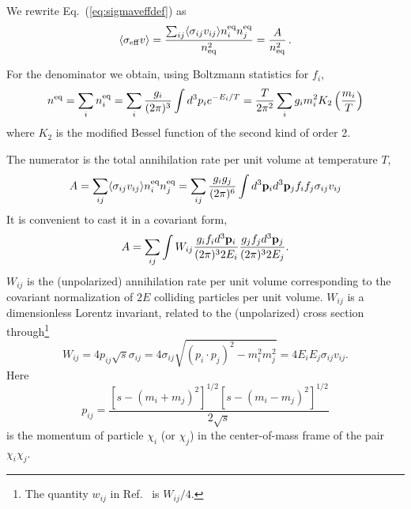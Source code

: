 We rewrite Eq.~(\ref{eq:sigmaveffdef}) as
\begin{equation} \label{eq:sigmaveff}
  \langle \sigma_{\rm{eff}} v \rangle = \frac{ \sum_{ij} \langle
  \sigma_{ij}v_{ij} \rangle n_{i}^{\rm{eq}} n_{j}^{\rm{eq}}}{n^2_{\rm{eq}}}
  = 
  \frac{A}{n_{\rm{eq}}^2} \, .
\end{equation}

For the denominator we obtain, 
using Boltzmann statistics for $f_i$,
\begin{equation} \label{eq:neq}
  n^{\rm eq} = \sum_i n^{\rm eq}_i = 
  \sum_i \frac{g_i}{(2\pi)^3} \int d^3 p_i 
  e^{-E_{i}/T} = 
  \frac{T}{2\pi^2} \sum_i g_i m_{i}^2
  K_{2} \left( \frac{m_{i}}{T}\right)
\end{equation}
where $K_{2}$ is the modified Bessel function of the second kind of 
order 2.

The numerator is the total annihilation rate per unit volume
at temperature $T$,
\begin{equation} 
  A = \sum_{ij} \langle \sigma_{ij} v_{ij} \rangle n_i^{\rm eq}
  n_j^{\rm eq} = \sum_{ij} \frac{g_{i}g_{j}}{(2\pi)^6} \int d^3 {\bf p}_{i}
  d^3{\bf p}_{j} f_{i}f_{j} \sigma_{ij} v_{ij}
\end{equation}
It is convenient
to cast it in a covariant form,
\begin{equation} 
  A = \sum_{ij} 
  \int W_{ij} \frac{g_i f_i d^3{\bf p}_i}{(2\pi)^3 2E_i}
  \frac{g_j f_j d^3{\bf p}_j}{(2\pi)^3 2E_j} .
\label{eq:Aij2}
\end{equation}
$W_{ij}$ is the (unpolarized) annihilation rate per unit volume
corresponding to the covariant normalization of $2E$ colliding
particles per unit volume. $W_{ij}$ is a dimensionless Lorentz
invariant, related to the (unpolarized) cross section
through\footnote{The quantity $w_{ij}$ in Ref.\ \protect\cite{Srednicki:1988ce}
  is $W_{ij}/4$.}
\begin{equation} \label{eq:Wijcross}
  W_{ij} = 4 p_{ij} \sqrt{s} \sigma_{ij} = 4 \sigma_{ij} \sqrt{(p_i
\cdot p_j)^2 - m_i^2 m_j^2} = 4 E_{i} E_{j} \sigma_{ij} v_{ij} .
\end{equation}
Here
\begin{equation}
  p_{ij} =
\frac{\left[s-(m_i+m_j)^2\right]^{1/2}
\left[s-(m_i-m_j)^2\right]^{1/2}}{2\sqrt{s}}
\end{equation}
is the momentum of particle $\chi_i$ (or $\chi_j$) in the
center-of-mass frame of the pair $\chi_i\chi_j$.

